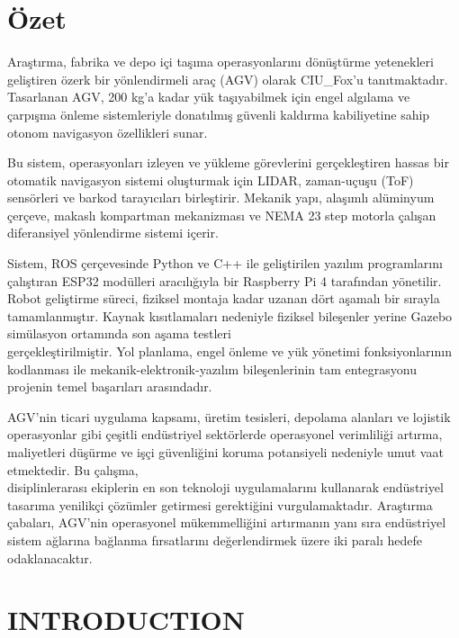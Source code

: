 \documentclass[main]{subfiles}
\begin{document}
\newpage
\centering
\chapter*{\hfil Özet \hfil}
\justifying
Araştırma, fabrika ve depo içi taşıma operasyonlarını dönüştürme yetenekleri geliştiren özerk bir yönlendirmeli araç (AGV) olarak CIU\_Fox'u tanıtmaktadır. 
Tasarlanan AGV, 200 kg'a kadar yük taşıyabilmek için engel algılama ve çarpışma önleme sistemleriyle donatılmış güvenli kaldırma kabiliyetine sahip otonom navigasyon özellikleri sunar.

Bu sistem, operasyonları izleyen ve yükleme görevlerini gerçekleştiren hassas bir otomatik navigasyon sistemi oluşturmak için LIDAR, zaman-uçuşu (ToF) sensörleri ve barkod tarayıcıları birleştirir. 
Mekanik yapı, alaşımlı alüminyum çerçeve, makaslı kompartman mekanizması ve NEMA 23 step motorla çalışan diferansiyel yönlendirme sistemi içerir.

Sistem, ROS çerçevesinde Python ve C++ ile geliştirilen yazılım programlarını çalıştıran ESP32 modülleri aracılığıyla bir Raspberry Pi 4 tarafından yönetilir. 
Robot geliştirme süreci, fiziksel montaja kadar uzanan dört aşamalı bir sırayla tamamlanmıştır. 
Kaynak kısıtlamaları nedeniyle fiziksel bileşenler yerine Gazebo simülasyon ortamında son aşama testleri \\ gerçekleştirilmiştir. 
Yol planlama, engel önleme ve yük yönetimi fonksiyonlarının kodlanması ile mekanik-elektronik-yazılım bileşenlerinin tam entegrasyonu projenin temel başarıları arasındadır.

AGV'nin ticari uygulama kapsamı, üretim tesisleri, depolama alanları ve lojistik operasyonlar gibi çeşitli endüstriyel sektörlerde operasyonel verimliliği artırma, maliyetleri düşürme ve işçi güvenliğini koruma potansiyeli nedeniyle umut vaat etmektedir. 
Bu çalışma,\\ disiplinlerarası ekiplerin en son teknoloji uygulamalarını kullanarak endüstriyel tasarıma yenilikçi çözümler getirmesi gerektiğini vurgulamaktadır. Araştırma çabaları, AGV'nin operasyonel mükemmelliğini artırmanın yanı sıra endüstriyel sistem ağlarına bağlanma fırsatlarını değerlendirmek üzere iki paralı hedefe odaklanacaktır.
\justifying

\newpage
\centering
\tableofcontents
\newpage

\listoffigures
\newpage

\listoftables
\newpage
\chapter{\hfil INTRODUCTION \hfil}
\justifying

\newpage
\centering
\end{document}
